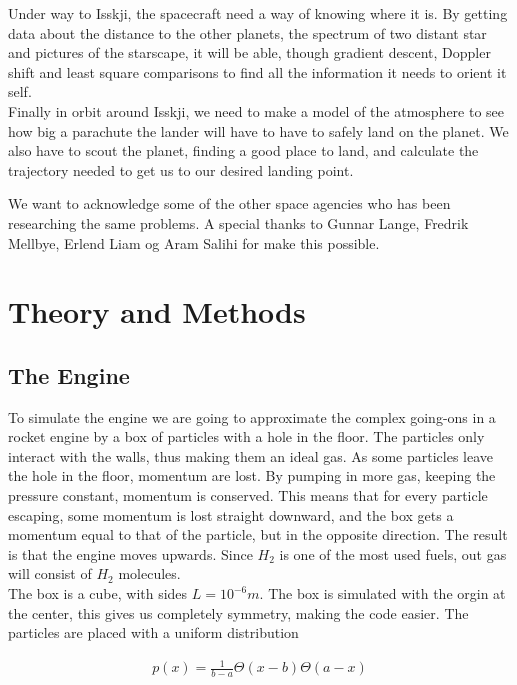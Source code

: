 \documentclass[a4paper, 10pt]{article}
\begin{document}
Under way to Isskji, the spacecraft need a way of knowing where it is. By getting data about the distance to the other planets, the spectrum of two distant star and pictures of the starscape, it will be able, though gradient descent, Doppler shift and least square comparisons to find all the information it needs to orient it self.\\

Finally in orbit around Isskji, we need to make a model of the atmosphere to see how big a parachute the lander will have to have to safely land on the planet. We also have to scout the planet, finding a good place to land, and calculate the trajectory needed to get us to our desired landing point.

We want to acknowledge some of the other space agencies who has been researching the same problems. A special thanks to Gunnar Lange, Fredrik Mellbye, Erlend Liam og Aram Salihi for make this possible.

\section{Theory and Methods}

\subsection{The Engine}

To simulate the engine we are going to approximate the complex going-ons in a rocket engine by a box of particles with a hole in the floor. The particles only interact with the walls, thus making them an ideal gas. As some particles leave the hole in the floor, momentum are lost. By pumping in more gas, keeping the pressure constant, momentum is conserved. This means that for every particle escaping, some momentum is lost straight downward, and the box gets a momentum equal to that of the particle, but in the opposite direction. The result is that the engine moves upwards. Since $H_2$ is one of the most used fuels, out gas will consist of $H_2$ molecules.\\

The box is a cube, with sides $L = 10^{-6}m$. The box is simulated with the orgin at the center, this gives us completely symmetry, making the code easier. The particles are placed with a uniform distribution 

\begin{align}
p(x) = \frac{1}{b-a}\Theta(x-b)\Theta(a-x)
\end{align}
\end{document}
